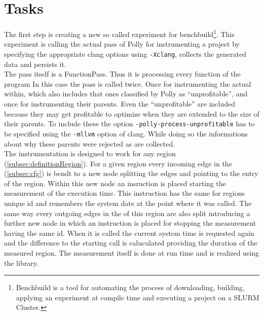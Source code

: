 \section{Tasks}
The first step is creating a new so called experiment for benchbuild\footnote{Benchbuild is a tool for automating the process of downloading, building, applying an experiment at compile time and executing a project on a SLURM Cluster.}.
This experiment is calling the actual pass of Polly for instrumenting a project by specifying the appropriate clang options using \texttt{-Xclang}, collects the generated data and persists it.\\
The pass itself is a FunctionPass.
Thus it is processing every function of the program
In this case the pass is called twice.
Once for instrumenting the actual \scops within, which also includes that ones classified by Polly as \enquote{unprofitable}, and once for instrumenting their parents.
Even the \enquote{unprofitable} \scops are included because they may get profitable to optimize when they are extended to the size of their parents.
To include these \scops the option \texttt{-polly-process-unprofitable} has to be specified using the \texttt{-mllvm} option of clang.
While doing so the informations about why these parents were rejected as \scops are collected.\\
The instrumentation is designed to work for any region (\autoref{subsec:definitionRegion}).
For a given region every incoming edge in the \cfg (\autoref{subsec:cfg}) is bendt to a new node splitting the edges and pointing to the entry of the region.
Within this new node an insruction is placed starting the measurement of the execution time.
This instruction has the same for regions unique id and remembers the system date at the point where it was called.
The same way every outgoing edges in the \cfg of this region are also split introducing a further new node in which an instruction is placed for stopping the measurement having the same id.
When it is called the current system time is requested again and the difference to the starting call is caluculated providing the duration of the measured region.
The measurement itself is done at run time and is realized using the \papi library.
